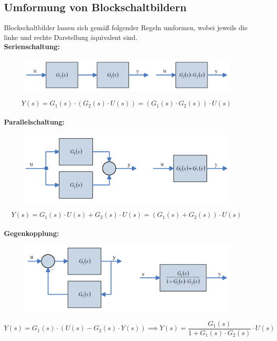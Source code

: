 \documentclass[10pt,a4paper]{article}
\begin{document}
\subsection{Umformung von Blockschaltbildern}
Blockschaltbilder lassen sich gemäß folgender Regeln umformen, wobei jeweils die linke und rechte Darstellung äquivalent sind. \\

\textbf{Serienschaltung:}
\begin{figure}[H]
	\includegraphics[width = \columnwidth]{imgs/serienschaltung.png}
\end{figure}
$$
	Y(s) = G_1(s) ⋅ (G_2(s) ⋅ U(s)) = (G_1(s) ⋅ G_2(s)) ⋅ U(s)
$$ \\

\textbf{Parallelschaltung:}
\begin{figure}[H]
	\includegraphics[width = \columnwidth]{imgs/parallelschaltung.png}
\end{figure}
$$
	Y(s) = G_1(s) ⋅ U(s) + G_2(s) ⋅ U(s) = (G_1(s) + G_2(s)) ⋅ U(s)
$$ \\

\textbf{Gegenkopplung:}
\begin{figure}[H]
	\includegraphics[width = \columnwidth]{imgs/gegenkopplung.png}
\end{figure}
$$
	Y(s) = G_1(s) ⋅ (U(s) - G_2(s) ⋅ Y(s)) \implies Y(s) = \frac{G_1(s)}{1 + G_1(s) ⋅ G_2(s)} ⋅ U(s)
$$ \\
\end{document}
